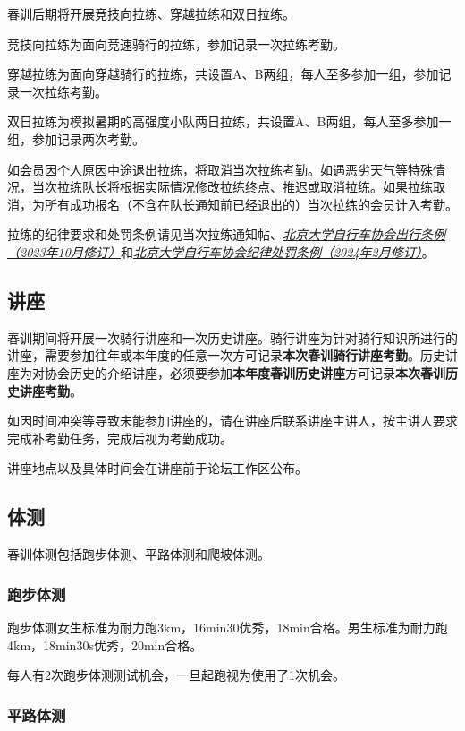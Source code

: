 \documentclass[UTF8]{ctexart}
\begin{document}
春训后期将开展竞技向拉练、穿越拉练和双日拉练。

竞技向拉练为面向竞速骑行的拉练，参加记录一次拉练考勤。

穿越拉练为面向穿越骑行的拉练，共设置A、B两组，每人至多参加一组，参加记录一次拉练考勤。

双日拉练为模拟暑期的高强度小队两日拉练，共设置A、B两组，每人至多参加一组，参加记录两次考勤。

如会员因个人原因中途退出拉练，将取消当次拉练考勤。如遇恶劣天气等特殊情况，当次拉练队长将根据实际情况修改拉练终点、推迟或取消拉练。如果拉练取消，为所有成功报名（不含在队长通知前已经退出的）当次拉练的会员计入考勤。

拉练的纪律要求和处罚条例请见当次拉练通知帖、\href{https://chexie.net/bbs/content/?bid=1&tid=9618&p=1}{\textit{北京大学自行车协会出行条例（2023年10月修订）}}和\href{https://chexie.net/bbs/content/?bid=1&tid=9751&p=1}{\textit{北京大学自行车协会纪律处罚条例（2024年2月修订）}}。

\subsection{讲座}


春训期间将开展一次骑行讲座和一次历史讲座。骑行讲座为针对骑行知识所进行的讲座，需要参加往年或本年度的任意一次方可记录\textbf{本次春训骑行讲座考勤}。历史讲座为对协会历史的介绍讲座，必须要参加\textbf{本年度春训历史讲座}方可记录\textbf{本次春训历史讲座考勤}。

如因时间冲突等导致未能参加讲座的，请在讲座后联系讲座主讲人，按主讲人要求完成补考勤任务，完成后视为考勤成功。

讲座地点以及具体时间会在讲座前于论坛工作区公布。

\subsection{体测}

春训体测包括跑步体测、平路体测和爬坡体测。

\subsubsection{跑步体测}

跑步体测女生标准为耐力跑3km，16min30优秀，18min合格。男生标准为耐力跑4km，18min30s优秀，20min合格。

每人有2次跑步体测测试机会，一旦起跑视为使用了1次机会。

\subsubsection{平路体测}
\end{document}
